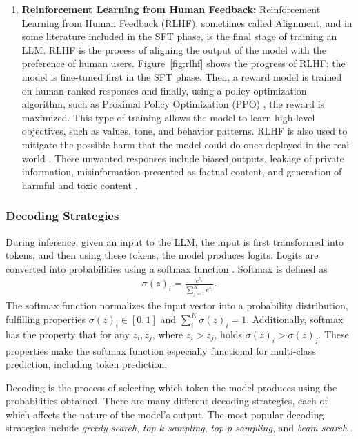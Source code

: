 \documentclass[english, 12pt, a4paper, sci, utf8, a-2b, online]{latex/definitions/aaltothesis}
\begin{document}
\begin{enumerate}
    \item \textbf{Reinforcement Learning from Human Feedback:} Reinforcement Learning from Human Feedback (RLHF), sometimes called Alignment, and in some literature included in the SFT phase, is the final stage of training an LLM. RLHF is the process of aligning the output of the model with the preference of human users. Figure~\ref{fig:rlhf} shows the progress of RLHF: the model is fine-tuned first in the SFT phase. Then, a reward model is trained on human-ranked responses and finally, using a policy optimization algorithm, such as Proximal Policy Optimization (PPO) \cite{zhang2025instructiontuninglargelanguage}, the reward is maximized. This type of training allows the model to learn high-level objectives, such as values, tone, and behavior patterns. RLHF is also used to mitigate the possible harm that the model could do once deployed in the real world \cite{ouyang2022traininglanguagemodelsfollow}. These unwanted responses include biased outputs, leakage of private information, misinformation presented as factual content, and generation of harmful and toxic content \cite{weidinger2021ethicalsocialrisksharm}.
\end{enumerate}

\subsubsection{Decoding Strategies} \label{sec:decoding}

During inference, given an input to the LLM, the input is first transformed into tokens, and then using these tokens, the model produces logits. Logits are converted into probabilities using a softmax function \cite{bishop2006pattern}. Softmax is defined as
\begin{align}
    \sigma(z)_i = \frac{e^{z_i}}{\sum^{K}_{j=1}e^{z_j}}.
\end{align}
The softmax function normalizes the input vector into a probability distribution, fulfilling properties $\sigma(z)_i \in [0, 1]$ and $\sum_i^K \sigma(z)_i = 1$. Additionally, softmax has the property that for any $z_i, z_j$, where $z_i > z_j$, holds $\sigma(z)_i > \sigma(z)_j$. These properties make the softmax function especially functional for multi-class prediction, including token prediction.

Decoding is the process of selecting which token the model produces using the probabilities obtained. There are many different decoding strategies, each of which affects the nature of the model's output. The most popular decoding strategies include \textit{greedy search}, \textit{top-$k$ sampling}, \textit{top-$p$ sampling}, and \textit{beam search} \cite{Minaee2024-fr}.
\end{document}
